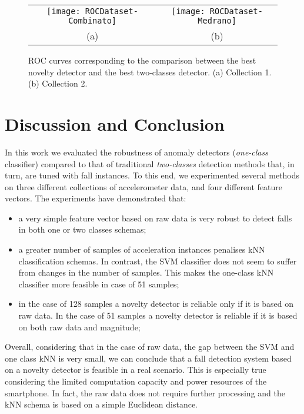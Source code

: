 \documentclass[twocolumn]{svjour3}          \smartqed  \usepackage[draft]{hyperref}
\begin{document}
\begin{figure*}[tb]
  \centering
  \scriptsize
   \setlength{\tabcolsep}{2.1pt}
  \begin{tabular}{cc}
  \texttt{[image: ROCDataset-Combinato]} &
  \texttt{[image: ROCDataset-Medrano]} \\
  (a)&(b)
   \end{tabular}
  \caption{ROC curves corresponding to the comparison between the best novelty detector and the best two-classes detector. (a) Collection 1. (b) Collection 2. }
  \label{fig:roc}
\end{figure*} 


\section{Discussion and Conclusion}
\label{sec:discussion}


In this work we evaluated the robustness of anomaly detectors (\emph{one-class} classifier) compared to that of traditional \emph{two-classes} detection methods that, in turn, are tuned with fall instances. To this end, we experimented  several methods  on three different collections of accelerometer data, and four different feature vectors. The experiments have demonstrated that:
\begin{itemize}
\item a very simple feature vector based on raw data is very robust to detect falls in both one or two classes schemas;
\item a greater number of samples of acceleration instances penalises kNN classification schemas. In contrast, the SVM classifier does not seem to suffer from changes in the number of samples. This makes the one-class kNN classifier more feasible in case of  51 samples;
\item  in the case of 128 samples a novelty detector is reliable only if it is based on raw data. In the case of 51 samples a novelty detector is reliable if it is based on both raw data and magnitude;
\end{itemize}

Overall, considering that in the case of raw data, the gap between the SVM and one class kNN is very small, we can conclude that a fall detection system based on a novelty detector is feasible in a real scenario. This is especially true considering the limited computation capacity and power resources of the smartphone. In fact, the raw data does not require further processing and the kNN schema is based on a simple Euclidean distance. 
\end{document}
